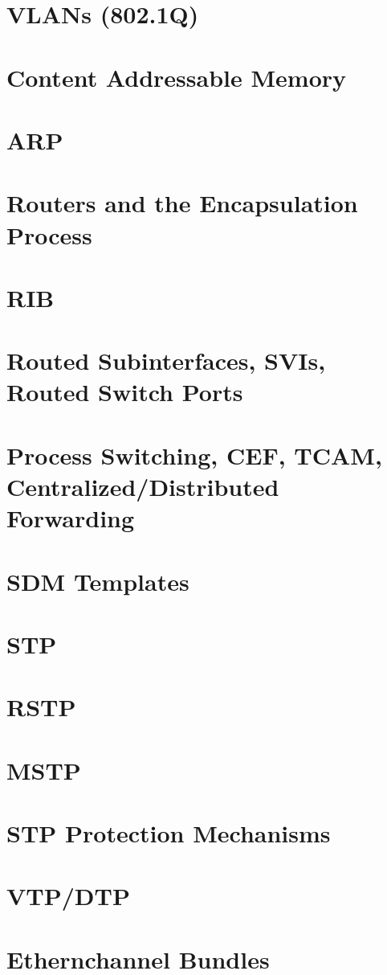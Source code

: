 \documentclass[parindent=0pt]{article}
\begin{document}
\section*{VLANs (802.1Q)}
\section*{Content Addressable Memory}
\section*{ARP}
\section*{Routers and the Encapsulation Process}
\section*{RIB}
\section*{Routed Subinterfaces, SVIs, Routed Switch Ports}
\section*{Process Switching, CEF, TCAM, Centralized/Distributed Forwarding}
\section*{SDM Templates}
\section*{STP}
\section*{RSTP}
\section*{MSTP}
\section*{STP Protection Mechanisms}
\section*{VTP/DTP}
\section*{Ethernchannel Bundles}
\end{document}
